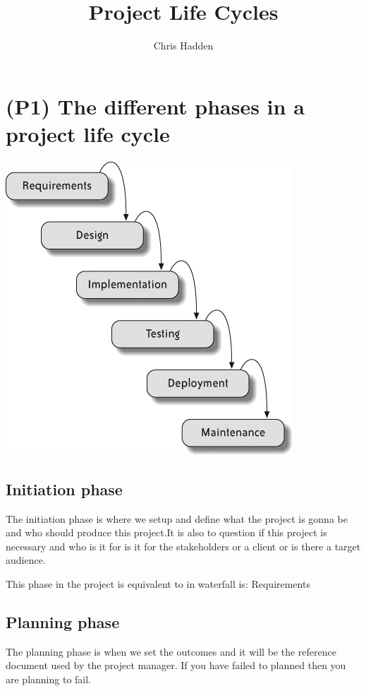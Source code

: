 \documentclass{article}
\title{Project Life Cycles}
\author{Chris Hadden}
\begin{document}
\maketitle

\tableofcontents

\section{(P1) The different phases in a project life cycle}
\includegraphics[scale=0.5]{Modern-Waterfall-Diagram}
\cite{modernwaterfall}
\subsection{Initiation phase}
The initiation phase is where we setup and define what the project is gonna be and who should produce this project.It is also to question if this project is necessary and who is it for is it for the stakeholders or a client or is there a target audience.

This phase in the project is equivalent to in waterfall is: Requirements

\subsection{Planning phase}
The planning phase is when we set the outcomes and it will be the reference document used by the project manager. If you have failed to planned then you are planning to fail. \\
\end{document}
